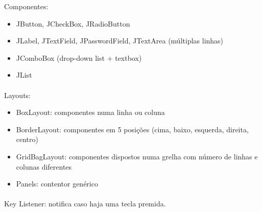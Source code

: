 \documentclass[../resumosLPOO.tex]{subfiles}
\begin{document}
 

Componentes:
\begin{itemize}
    \item JButton, JCheckBox, JRadioButton
    \item JLabel, JTextField, JPasswordField, JTextArea (múltiplas linhas)
    \item JComboBox (drop-down list + textbox)
    \item JList
\end{itemize}

\paragraph{}

Layouts:
\begin{itemize}
    \item BoxLayout: componentes numa linha ou coluna
    \item BorderLayout: componentes em 5 posições (cima, baixo, esquerda, direita, centro)
    \item GridBagLayout: componentes dispostos numa grelha com número de linhas e colunas diferentes
    \item Panels: contentor genérico
\end{itemize}

\paragraph{}

Key Listener: notifica caso haja uma tecla premida.
\end{document}
